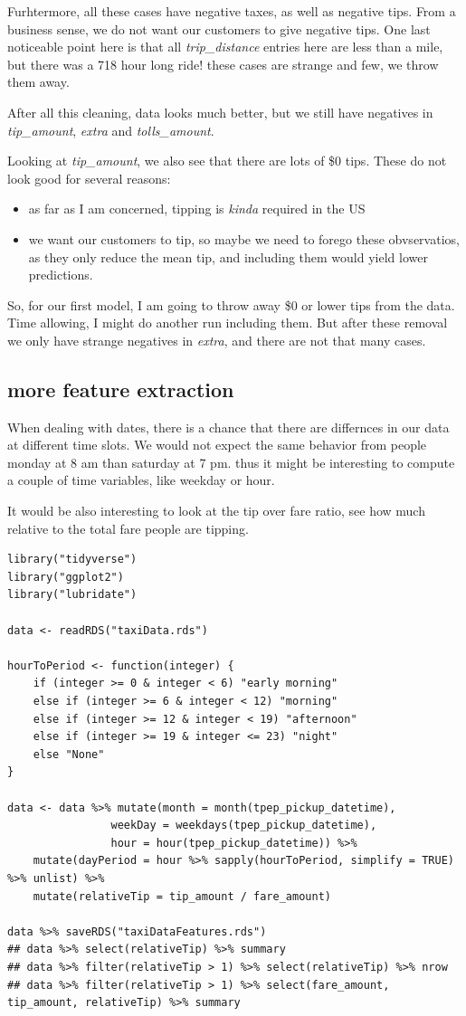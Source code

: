\documentclass[11pt]{article}
\begin{document}
Furhtermore, all these cases have negative taxes, as well as negative tips. From a business
sense, we do not want our customers to give negative tips. One last noticeable point here
is that all \emph{trip\_distance} entries here are less than a mile, but there was a 718 hour long
ride! these cases are strange and few, we throw them away.

After all this cleaning, data looks much better, but we still have negatives in \emph{tip\_amount},
\emph{extra} and \emph{tolls\_amount}.

Looking at \emph{tip\_amount}, we also see that there are lots of \$0 tips. These do not look good
for several reasons:
\begin{itemize}
\item as far as I am concerned, tipping is \emph{kinda} required in the US
\item we want our customers to tip, so maybe we need to forego these obvservatios, as they only
reduce the mean tip, and including them would yield lower predictions.
\end{itemize}
So, for our first model, I am going to throw away \$0 or lower tips from the data. Time
allowing, I might do another run including them. But after these removal we only have
strange negatives in \emph{extra}, and there are not that many cases.


\subsection{more feature extraction}
\label{sec:org9b92787}
When dealing with dates, there is a chance that there are differnces in our data
at different time slots. We would not expect the same behavior from people
monday at 8 am than saturday at 7 pm. thus it might be interesting to compute
a couple of time variables, like weekday or hour.

It would be also interesting to look at the tip over fare ratio, see how much
relative to the total fare people are tipping. 

\begin{verbatim}
library("tidyverse")
library("ggplot2")
library("lubridate")

data <- readRDS("taxiData.rds")

hourToPeriod <- function(integer) {
    if (integer >= 0 & integer < 6) "early morning"
    else if (integer >= 6 & integer < 12) "morning"
    else if (integer >= 12 & integer < 19) "afternoon"
    else if (integer >= 19 & integer <= 23) "night"
    else "None"
}

data <- data %>% mutate(month = month(tpep_pickup_datetime),
                weekDay = weekdays(tpep_pickup_datetime),
                hour = hour(tpep_pickup_datetime)) %>%
    mutate(dayPeriod = hour %>% sapply(hourToPeriod, simplify = TRUE) %>% unlist) %>%
    mutate(relativeTip = tip_amount / fare_amount)

data %>% saveRDS("taxiDataFeatures.rds")
## data %>% select(relativeTip) %>% summary
## data %>% filter(relativeTip > 1) %>% select(relativeTip) %>% nrow
## data %>% filter(relativeTip > 1) %>% select(fare_amount, tip_amount, relativeTip) %>% summary


\end{verbatim}
\end{document}
